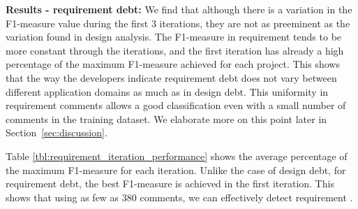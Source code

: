 \noindent \textbf{Results - requirement debt:} We find that although there is a variation in the F1-measure value during the first 3 iterations, they are not as preeminent as the variation found in design \SATD analysis. The F1-measure in requirement \SATD tends to be more constant through the iterations, and the first iteration has already a high percentage of the maximum F1-measure achieved for each project. This shows that the way the developers indicate requirement debt does not vary between different application domains as much as in design debt. This uniformity in requirement \SATD comments allows a good classification even with a small number of comments in the training dataset. We elaborate more on this point later in Section~\ref{sec:discussion}.




Table \ref{tbl:requirement_iteration_performance} shows the average percentage of the maximum F1-measure for each iteration. Unlike the case of design debt, for requirement debt, the best F1-measure is achieved in the first iteration. This shows that using as few as 380 comments, we can effectively detect requirement \SATD.

